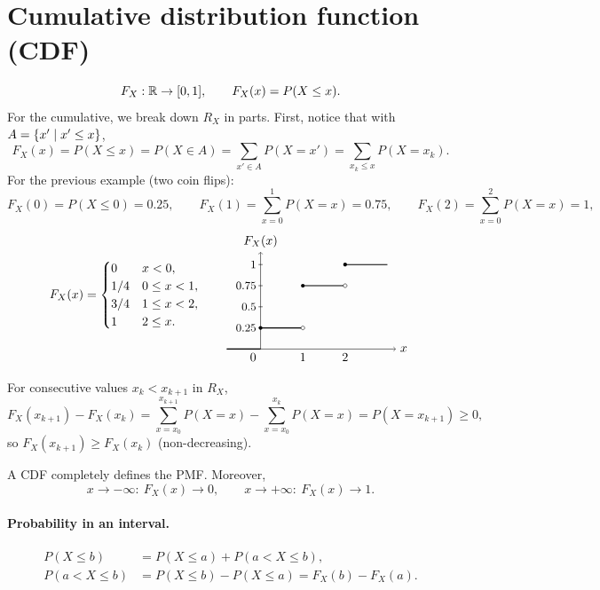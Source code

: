 \section{Cumulative distribution function (CDF)}
\[
F_X : \mathbb{R} \to [0,1], \qquad F_X(x) = P(X \le x).
\]
For the cumulative, we break down $R_X$ in parts. First, notice that with $A = \left\{x' \mid x' \le x\right\}$,
\[
F_X(x) = P(X \le x) = P(X \in A) = \sum_{x' \in A} P(X = x') = \sum_{x_k \le x} P(X = x_k).
\]
For the previous example (two coin flips):
\[
F_X(0) = P(X \le 0) = 0.25, \qquad F_X(1) = \sum_{x=0}^{1} P(X=x) = 0.75, \qquad F_X(2) = \sum_{x=0}^{2} P(X=x) = 1,
\]
\[
F_X(x) =
\begin{cases}
0 & x < 0,\\
1/4 & 0 \le x < 1,\\
3/4 & 1 \le x < 2,\\
1 & 2 \le x.
\end{cases}
\qquad
\begin{tikzpicture}[baseline=(current bounding box.center),x=1.2cm,y=2.4cm]
\draw[->] (-0.8,0) -- (3.2,0) node[right] {$x$};
\draw[->] (0,0) -- (0,1.15) node[above] {$F_X(x)$};
\draw[thick] (-0.8,0) -- (0,0);
\draw[thick] (0,0.25) -- (1,0.25); \fill (0,0.25) circle (1.5pt); \draw[fill=white] (1,0.25) circle (1.5pt);
\draw[thick] (1,0.75) -- (2,0.75); \fill (1,0.75) circle (1.5pt); \draw[fill=white] (2,0.75) circle (1.5pt);
\draw[thick] (2,1) -- (3,1); \fill (2,1) circle (1.5pt);
\foreach \y in {0.25,0.5,0.75,1} {\draw (-0.05,\y) -- (0.05,\y); \node[left] at (0,\y) {\small $\y$};}
\node[below] at (1,0) {1}; \node[below] at (2,0) {2}; \node[below left] at (0,0) {0};
\end{tikzpicture}
\]

For consecutive values $x_k < x_{k+1}$ in $R_X$,
\[
F_X(x_{k+1}) - F_X(x_k) = \sum_{x = x_0}^{x_{k+1}} P(X = x) - \sum_{x = x_0}^{x_k} P(X = x) = P(X = x_{k+1}) \ge 0,
\]
so $F_X(x_{k+1}) \ge F_X(x_k)$ (non-decreasing).

A CDF completely defines the PMF. Moreover,
\[
x \to -\infty: \ F_X(x) \to 0, \qquad x \to +\infty: \ F_X(x) \to 1.
\]

\paragraph{Probability in an interval.}
\begin{align*}
P(X \le b) &= P(X \le a) + P(a < X \le b),\\
P(a < X \le b) &= P(X \le b) - P(X \le a) = F_X(b) - F_X(a).
\end{align*}

